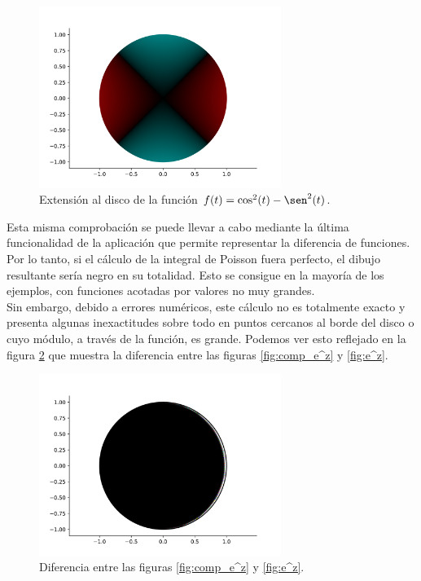 \begin{figure}[!htbp]
    \centering
    \includegraphics[width=0.7\textwidth]{../Aplicacion/cos^2(t)-sen^2(t).png}
    \caption{Extensión al disco de la función $f(t) = \cos^2(t) - \sen^2(t)$.}
    \label{fig:comparacion4}
\end{figure}

Esta misma comprobación se puede llevar a cabo mediante la última funcionalidad de la aplicación que permite representar la diferencia de funciones. Por lo tanto, si el cálculo de la integral de Poisson fuera perfecto, el dibujo resultante sería negro en su totalidad. Esto se consigue en la mayoría de los ejemplos, con funciones acotadas por valores no muy grandes. \\

Sin embargo, debido a errores numéricos, este cálculo no es totalmente exacto y presenta algunas inexactitudes sobre todo en puntos cercanos al borde del disco o cuyo módulo, a través de la función, es grande. Podemos ver esto reflejado en la figura \ref{fig:diferencia} que muestra la diferencia entre las figuras \ref{fig:comp_e^z} y \ref{fig:e^z}. \\

\begin{figure}[!htbp]
    \centering
    \includegraphics[width=0.7\textwidth]{../Aplicacion/diff_e^z.png}
    \caption{Diferencia entre las figuras \ref{fig:comp_e^z} y \ref{fig:e^z}.}
    \label{fig:diferencia}
\end{figure}

